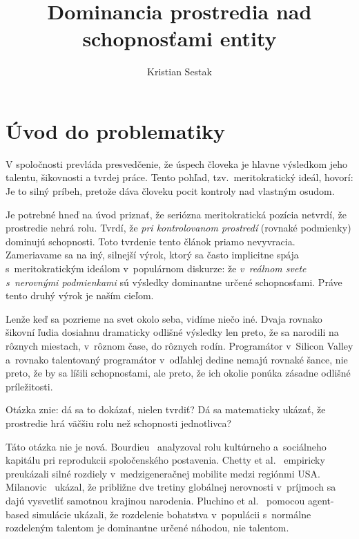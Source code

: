 \documentclass[12pt,a4paper]{article}
\title{Dominancia prostredia nad schopnosťami entity}
\author{Kristian Sestak}
\date{}
\begin{document}
\maketitle

\section{Úvod do problematiky}

V spoločnosti prevláda presvedčenie, že úspech človeka je hlavne výsledkom jeho talentu, šikovnosti a tvrdej práce. Tento pohľad, tzv.\ meritokratický ideál, hovorí:  Je to silný príbeh, pretože dáva človeku pocit kontroly nad vlastným osudom.

Je potrebné hneď na úvod priznať, že seriózna meritokratická pozícia netvrdí, že prostredie nehrá rolu. Tvrdí, že \emph{pri kontrolovanom prostredí} (rovnaké podmienky) dominujú schopnosti. Toto tvrdenie tento článok priamo nevyvracia. Zameriavame sa na iný, silnejší výrok, ktorý sa často implicitne spája s~meritokratickým ideálom v~populárnom diskurze: že \emph{v~reálnom svete s~nerovnými podmienkami} sú výsledky dominantne určené schopnosťami. Práve tento druhý výrok je naším cieľom.

Lenže keď sa pozrieme na svet okolo seba, vidíme niečo iné. Dvaja rovnako šikovní ľudia dosiahnu dramaticky odlišné výsledky len preto, že sa narodili na rôznych miestach, v~rôznom čase, do rôznych rodín. Programátor v~Silicon Valley a~rovnako talentovaný programátor v~odľahlej dedine nemajú rovnaké šance, nie preto, že by sa líšili schopnosťami, ale preto, že ich okolie ponúka zásadne odlišné príležitosti.

Otázka znie: dá sa to dokázať, nielen tvrdiť? Dá sa matematicky ukázať, že prostredie hrá väčšiu rolu než schopnosti jednotlivca?

Táto otázka nie je nová. Bourdieu~\cite{bourdieu1986} analyzoval rolu kultúrneho a~sociálneho kapitálu pri reprodukcii spoločenského postavenia. Chetty et al.~\cite{chetty2014} empiricky preukázali silné rozdiely v~medzigeneračnej mobilite medzi regiónmi USA. Milanovic~\cite{milanovic2015} ukázal, že približne dve tretiny globálnej nerovnosti v~príjmoch sa dajú vysvetliť samotnou krajinou narodenia. Pluchino et al.~\cite{pluchino2018} pomocou agent-based simulácie ukázali, že rozdelenie bohatstva v~populácii s~normálne rozdeleným talentom je dominantne určené náhodou, nie talentom.
\end{document}
